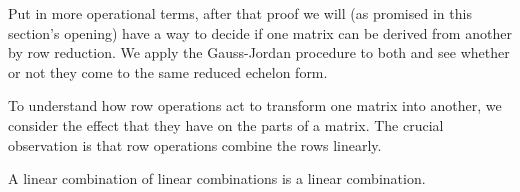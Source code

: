 Put in more operational terms,
after that proof we will (as promised in this section's opening) have a
way to decide if one matrix can be derived from another by row reduction.
We apply the Gauss-Jordan procedure to both and see whether
or not they come to the same reduced echelon form.



To understand how row operations act to transform one matrix into another,
we consider the effect that they have on the parts of a matrix.
The crucial observation is that row operations combine the rows linearly.



\begin{lemma} 
A linear combination of linear combinations is a linear combination.
\end{lemma}

